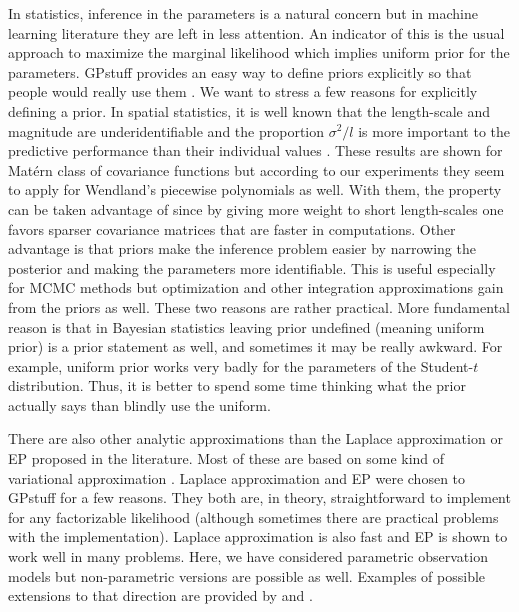 \documentclass[twoside,11pt]{article}
\newcommand{\pkg}[1]{{\fontseries{b}\selectfont #1}}
\begin{document}
In statistics, inference in the parameters is a natural concern but in
machine learning literature they are left in less attention. An
indicator of this is the usual approach to maximize the marginal
likelihood which implies uniform prior for the parameters.
\pkg{GPstuff} provides an easy way to define priors explicitly so that
people would really use them \citep[this principle is also in line
with reasoning by][]{Gelman:2006}. We want to stress a few reasons for
explicitly defining a prior. In spatial statistics, it is well known
that the length-scale and magnitude are underidentifiable and the
proportion $\sigma^2/l$ is more important to the predictive
performance than their individual values
\citep{Diggle+Tawn+Moyeed:1998,Zhang:2004,Diggle+Ribeiro:2007}. These
results are shown for Mat{\'e}rn class of covariance functions but
according to our experiments they seem to apply for Wendland's
piecewise polynomials as well. With them, the property can be taken
advantage of since by giving more weight to short length-scales one
favors sparser covariance matrices that are faster in computations.
Other advantage is that priors make the inference problem easier by
narrowing the posterior and making the parameters more identifiable.
This is useful especially for MCMC methods but optimization and other
integration approximations gain from the priors as well. These two
reasons are rather practical. More fundamental reason is that in
Bayesian statistics leaving prior undefined (meaning uniform prior) is
a prior statement as well, and sometimes it may be really awkward. For
example, uniform prior works very badly for the parameters of the
Student-$t$ distribution. Thus, it is better to spend some time
thinking what the prior actually says than blindly use the uniform.

There are also other analytic approximations than the
Laplace approximation or EP proposed in the literature. Most of these
are based on some kind of variational approximation
\citep{Gibbs+MacKay:2000,Csato+Opper:2002,Tipping+Lawrence:2005,Kuss:2006,Opper+Archambeau:2009}.
Laplace approximation and EP were chosen to \pkg{GPstuff} for a few
reasons. They both are, in theory, straightforward to implement for
any factorizable likelihood (although sometimes there are practical
problems with the implementation). Laplace approximation is also fast
and EP is shown to work well in many problems. Here, we have
considered parametric observation models but non-parametric versions
are possible as well. Examples of possible extensions to that
direction are provided by \citet{Snelson+Rasmussen+Ghahramani:2004}
and \citet{Tokdar+Zhu+Ghosh:2010}.
\end{document}
